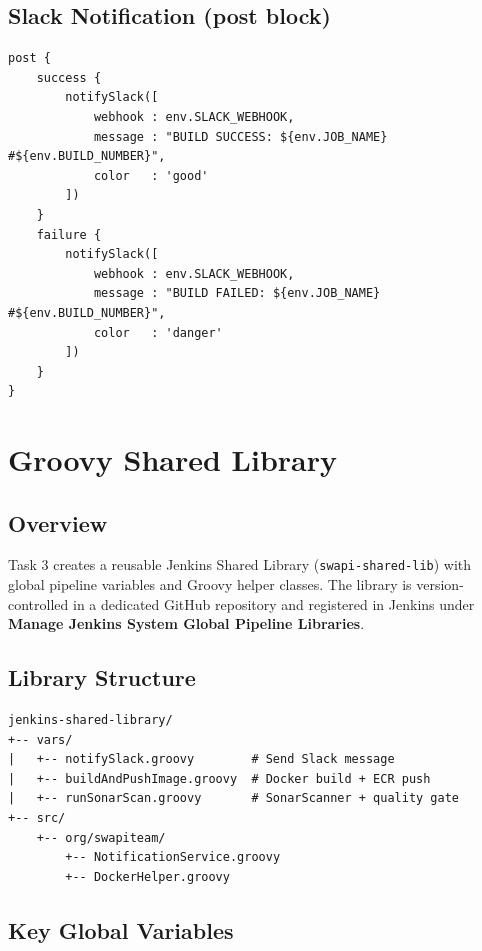\documentclass[12pt,a4paper]{article}
\begin{document}
\subsection{Slack Notification (post block)}

\begin{lstlisting}[caption={Post-build Slack notifications using shared library}, label={lst:slack}]
post {
    success {
        notifySlack([
            webhook : env.SLACK_WEBHOOK,
            message : "BUILD SUCCESS: ${env.JOB_NAME} #${env.BUILD_NUMBER}",
            color   : 'good'
        ])
    }
    failure {
        notifySlack([
            webhook : env.SLACK_WEBHOOK,
            message : "BUILD FAILED: ${env.JOB_NAME} #${env.BUILD_NUMBER}",
            color   : 'danger'
        ])
    }
}
\end{lstlisting}

\newpage
\section{Groovy Shared Library}

\subsection{Overview}
Task 3 creates a reusable Jenkins Shared Library (\texttt{swapi-shared-lib}) with
global pipeline variables and Groovy helper classes. The library is version-controlled
in a dedicated GitHub repository and registered in Jenkins under
\textbf{Manage Jenkins \textrightarrow{} System \textrightarrow{} Global Pipeline Libraries}.

\subsection{Library Structure}

\begin{verbatim}
jenkins-shared-library/
+-- vars/
|   +-- notifySlack.groovy        # Send Slack message
|   +-- buildAndPushImage.groovy  # Docker build + ECR push
|   +-- runSonarScan.groovy       # SonarScanner + quality gate
+-- src/
    +-- org/swapiteam/
        +-- NotificationService.groovy
        +-- DockerHelper.groovy
\end{verbatim}

\subsection{Key Global Variables}
\end{document}
